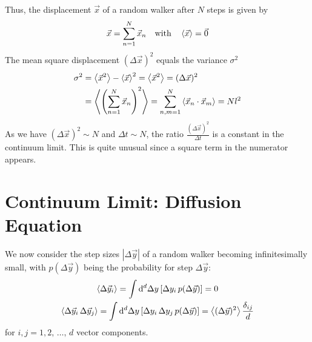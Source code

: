 \documentclass{notebook}
\begin{document}
Thus, the displacement $\vec{x}$ of a random walker after $N$ steps is given by
%
\begin{equation}
\vec{x} = \sum^N_{n = 1}{\vec{x}_n} \quad \mathrm{with} \quad \expval{\vec{x}} = \vec{0}
\end{equation}
%
The mean square displacement $(\Delta \vec{x})^2$ equals the variance $\sigma^2$
%
\begin{align*}
\sigma^2 &= \expval{\vec{x}^2} - \expval{\vec{x}}^2 = \expval{\vec{x}^2} = (\Delta \vec{x})^2 \\ 
&= \expval{\left( \sum^N_{n = 1}{\vec{x}_n} \right)^2} = \sum^N_{n, m = 1}\expval{\vec{x}_n \cdot \vec{x}_m} = N l^2
\end{align*}
%
As we have $(\Delta \vec{x})^2 \sim N$ and $\Delta t \sim N $, the ratio $\frac{(\Delta \vec{x})^2}{\Delta t}$ is a constant in the continuum limit. This is quite unusual since a square term in the numerator appears.  

\section{Continuum Limit: Diffusion Equation}

We now consider the step sizes $|\Delta \vec{y}|$ of a random walker becoming infinitesimally small, with $p(\Delta \vec{y})$ being the probability for step $\Delta \vec{y}$:
%
\begin{gather}
\expval{\Delta \vec{y}_i} = \int{\dd[d]{\Delta y} \left[ \Delta y_i \, p(\Delta \vec{y}) \right]} = 0 \\
\expval{\Delta \vec{y}_i \, \Delta \vec{y}_j} = \int{\dd[d]{\Delta y} \left[ \Delta y_i \, \Delta y_j \, p(\Delta \vec{y}) \right]} = \expval{(\Delta \vec{y})^2} \frac{\delta_{ij}}{d}
\end{gather}
%
for $i, j = 1, 2, \, \dots, \, d$ vector components.
\end{document}
